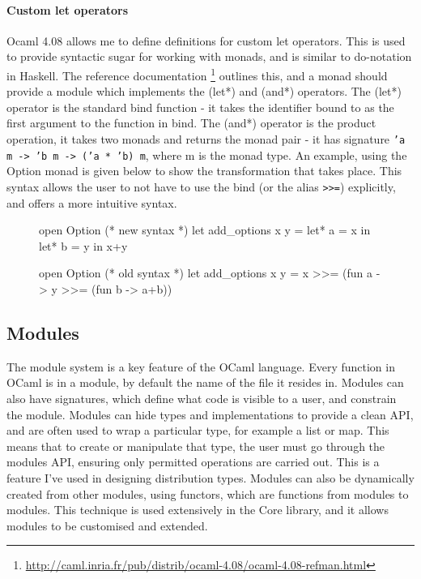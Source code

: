 \paragraph{Custom let operators}
Ocaml 4.08 allows me to define definitions for custom let operators. This is used to provide syntactic sugar for working with monads, and is similar to do-notation in Haskell. The reference documentation \footnote{\url{http://caml.inria.fr/pub/distrib/ocaml-4.08/ocaml-4.08-refman.html}} outlines this, and a monad should provide a module which implements the (let*) and (and*) operators. The (let*) operator is the standard bind function - it takes the identifier bound to as the first argument to the function in bind. The (and*) operator is the product operation, it takes two monads and returns the monad pair - it has signature \texttt{'a m -> 'b m -> ('a * 'b) m}, where m is the monad type. An example, using the Option monad is given below to show the transformation that takes place. This syntax allows the user to not have to use the bind (or the alias \texttt{>>=}) explicitly, and offers a more intuitive syntax.
	
\begin{figure}[!htb]
	\centering
	\begin{minipage}{0.45\textwidth}
		\centering
		\begin{ocamlcode-in}
			open Option
			(* new syntax *)
			let add_options x y = 
			  let* a = x in
			  let* b = y in
			  x+y
		\end{ocamlcode-in}
	\end{minipage}
	\begin{minipage}{0.45\textwidth}
		\centering
		\begin{ocamlcode-in}
			open Option
			(* old syntax *)
			let add_options x y = 
			  x >>= (fun a -> 
			    y >>= (fun b ->
			      a+b))
		\end{ocamlcode-in}
	\end{minipage}
\end{figure}
	
\subsection{Modules}
The module system is a key feature of the OCaml language. Every function in OCaml is in a module, by default the name of the file it resides in. Modules can also have signatures, which define what code is visible to a user, and constrain the module. Modules can hide types and implementations to provide a clean API, and are often used to wrap a particular type, for example a list or map. This means that to create or manipulate that type, the user must go through the modules API, ensuring only permitted operations are carried out. This is a feature I've used in designing distribution types. Modules can also be dynamically created from other modules, using functors, which are functions from modules to modules. This technique is used extensively in the Core library, and it allows modules to be customised and extended.
	
